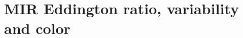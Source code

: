 \documentclass[linenumbers]{aastex631}
\begin{document}
 




\section{MIR Eddington ratio, variability and color}\label{sec:mir_var_col_lum}


\end{document}
